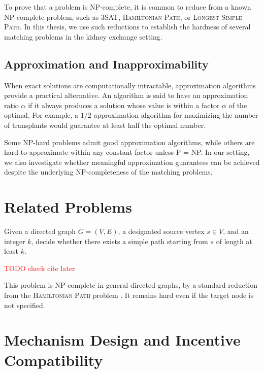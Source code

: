 To prove that a problem is NP-complete, it is common to reduce from a known NP-complete problem, such as \textsc{3SAT}, \textsc{Hamiltonian Path}, or \textsc{Longest Simple Path}. In this thesis, we use such reductions to establish the hardness of several matching problems in the kidney exchange setting.

\subsection*{Approximation and Inapproximability}

When exact solutions are computationally intractable, approximation algorithms provide a practical alternative. An algorithm is said to have an approximation ratio $\alpha$ if it always produces a solution whose value is within a factor $\alpha$ of the optimal. For example, a $1/2$-approximation algorithm for maximizing the number of transplants would guarantee at least half the optimal number.

Some NP-hard problems admit good approximation algorithms, while others are hard to approximate within any constant factor unless P = NP. In our setting, we also investigate whether meaningful approximation guarantees can be achieved despite the underlying NP-completeness of the matching problems.


\section{Related Problems}

\begin{problem}
\label{prob:longest_simple_path}
Given a directed graph $G = (V, E)$, a designated source vertex $s \in V$, and an integer $k$, decide whether there exists a simple path starting from $s$ of length at least $k$.
\end{problem}
\textcolor{red}{TODO check cite later}

This problem is NP-complete in general directed graphs, by a standard reduction from the \textsc{Hamiltonian Path} problem \cite{garey1979computers}. It remains hard even if the target node is not specified.

\section{Mechanism Design and Incentive Compatibility}

